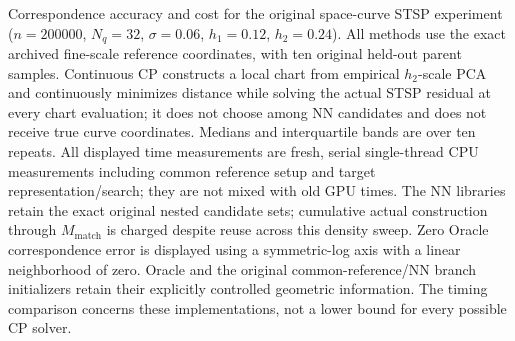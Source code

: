 \caption{Correspondence accuracy and cost for the original space-curve STSP experiment ($n=200000$, $N_q=32$, $\sigma=0.06$, $h_1=0.12$, $h_2=0.24$). All methods use the exact archived fine-scale reference coordinates, with ten original held-out parent samples. Continuous CP constructs a local chart from empirical $h_2$-scale PCA and continuously minimizes distance while solving the actual STSP residual at every chart evaluation; it does not choose among NN candidates and does not receive true curve coordinates. Medians and interquartile bands are over ten repeats. All displayed time measurements are fresh, serial single-thread CPU measurements including common reference setup and target representation/search; they are not mixed with old GPU times. The NN libraries retain the exact original nested candidate sets; cumulative actual construction through $M_{\mathrm{match}}$ is charged despite reuse across this density sweep. Zero Oracle correspondence error is displayed using a symmetric-log axis with a linear neighborhood of zero. Oracle and the original common-reference/NN branch initializers retain their explicitly controlled geometric information. The timing comparison concerns these implementations, not a lower bound for every possible CP solver.}
